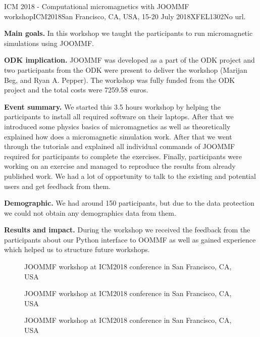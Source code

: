 \begin{event}{ICM 2018 - Computational micromagnetics with JOOMMF workshop}{ICM2018}{San Francisco, CA, USA, 15-20 July 2018}{XFEL}{130}{2}{No url.}

\textbf{Main goals.} In this workshop we taught the participants to run micromagnetic simulations using JOOMMF.

\textbf{ODK implication.} JOOMMF was developed as a part of the ODK project and two participants from the ODK were present to deliver the workshop (Marijan Beg, and Ryan A. Pepper). The workshop was fully funded from the ODK project and the total costs were 7259.58 euros.

\textbf{Event summary.} We started this 3.5 hours workshop by helping the participants to install all required software on their laptops. After that we introduced some physics basics of micromagnetics as well as theoretically explained how does a micromagnetic simulation work. After that we went through the tutorials and explained all individual commands of JOOMMF required for participants to complete the exercises. Finally, participants were working on an exercise and managed to reproduce the results from already published work. We had a lot of opportunity to talk to the existing and potential users and get feedback from them.

\textbf{Demographic.} We had around 150 participants, but due to the data protection we could not obtain any demographics data from them.

\textbf{Results and impact.} During the workshop we received the feedback from the participants about our Python interface to OOMMF as well as gained experience which helped us to structure future workshops.

\begin{figure}[ht]

\caption*{JOOMMF workshop at ICM2018 conference in San Francisco, CA, USA}
\end{figure}

\begin{figure}[ht]

\caption*{JOOMMF workshop at ICM2018 conference in San Francisco, CA, USA}
\end{figure}

\begin{figure}[ht]

\caption*{JOOMMF workshop at ICM2018 conference in San Francisco, CA, USA}
\end{figure}

\end{event}
